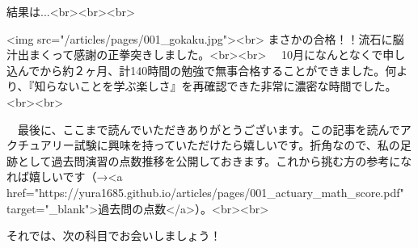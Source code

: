 結果は...<br><br><br>

<img src="/articles/pages/001_gokaku.jpg"><br>
まさかの合格！！流石に脳汁出まくって感謝の正拳突きしました。<br><br>
　10月になんとなくで申し込んでから約２ヶ月、計140時間の勉強で無事合格することができました。何より、『知らないことを学ぶ楽しさ』を再確認できた非常に濃密な時間でした。<br><br>



　最後に、ここまで読んでいただきありがとうございます。この記事を読んでアクチュアリー試験に興味を持っていただけたら嬉しいです。折角なので、私の足跡として過去問演習の点数推移を公開しておきます。これから挑む方の参考になれば嬉しいです（→<a href="https://yura1685.github.io/articles/pages/001_actuary_math_score.pdf" target="_blank">過去問の点数</a>）。<br><br>

それでは、次の科目でお会いしましょう！